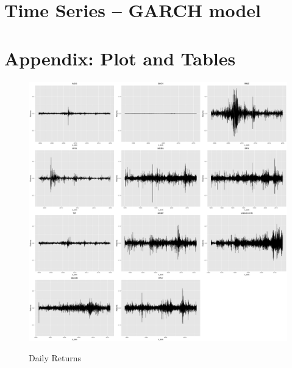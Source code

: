 \documentclass[12pt]{article}
\begin{document}

\clearpage

\section{Time Series -- GARCH model}%



\clearpage

\section{Appendix: Plot and Tables}%

\begin{figure}[h]
\caption{Daily Returns} 
\centering 
\includegraphics[width=15cm]{../results/returns}
\label{fig: dailyReturns}
\end{figure}
\end{document}
